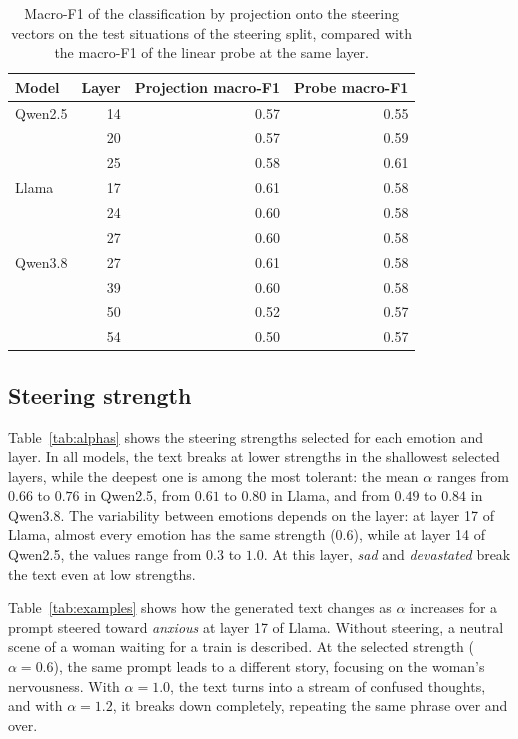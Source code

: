 \documentclass{article}
\begin{document}
\begin{table}[t]
  \centering
  \begin{tabular}{lrrr}
    \toprule
    Model & Layer & Projection macro-F1 & Probe macro-F1 \\
    \midrule
    Qwen2.5 & 14 & 0.57 & 0.55 \\
            & 20 & 0.57 & 0.59 \\
            & 25 & 0.58 & 0.61 \\
    \midrule
    Llama   & 17 & 0.61 & 0.58 \\
            & 24 & 0.60 & 0.58 \\
            & 27 & 0.60 & 0.58 \\
    \midrule
    Qwen3.8 & 27 & 0.61 & 0.58 \\
            & 39 & 0.60 & 0.58 \\
            & 50 & 0.52 & 0.57 \\
            & 54 & 0.50 & 0.57 \\
    \bottomrule
  \end{tabular}
  \caption{Macro-F1 of the classification by projection onto the steering vectors on the test situations of the steering split, compared with the macro-F1 of the linear probe at the same layer.}
  \label{tab:projection}
\end{table}

\subsection{Steering strength}
\label{sec:results_strength}
Table~\ref{tab:alphas} shows the steering strengths selected for each emotion and layer. In all models, the text breaks at lower strengths in the shallowest selected layers, while the deepest one is among the most tolerant: the mean $\alpha$ ranges from $0.66$ to $0.76$ in Qwen2.5, from $0.61$ to $0.80$ in Llama, and from $0.49$ to $0.84$ in Qwen3.8. The variability between emotions depends on the layer: at layer 17 of Llama, almost every emotion has the same strength ($0.6$), while at layer 14 of Qwen2.5, the values range from $0.3$ to $1.0$. At this layer, \textit{sad} and \textit{devastated} break the text even at low strengths.

Table~\ref{tab:examples} shows how the generated text changes as $\alpha$ increases for a prompt steered toward \textit{anxious} at layer 17 of Llama. Without steering, a neutral scene of a woman waiting for a train is described. At the selected strength ($\alpha = 0.6$), the same prompt leads to a different story, focusing on the woman's nervousness. With $\alpha = 1.0$, the text turns into a stream of confused thoughts, and with $\alpha = 1.2$, it breaks down completely, repeating the same phrase over and over.
\end{document}
